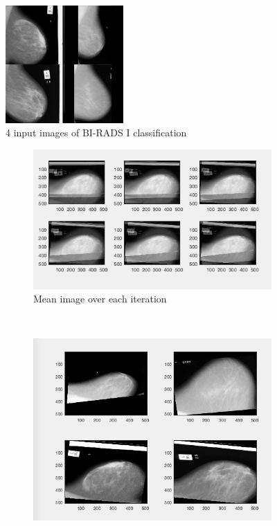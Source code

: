 \begin{figure}[!ht]
  \centering
  \includegraphics[width=0.4\textwidth]{Chapter2/non-prob-img/big_scan_1.jpg}
  \caption{4 input images of BI-RADS I classification}
  \label{fig:input}
\end{figure}

\begin{figure}[!ht]
    \centering
    \begin{subfigure}[b]{0.4\textwidth}
        \includegraphics[width=\textwidth]{Chapter2/non-prob-img/iteration-mean.png}
        \caption{Mean image over each iteration}
        \label{fig:mean-imgs}
    \end{subfigure}
    ~ %
    \begin{subfigure}[b]{0.4\textwidth}
        \includegraphics[width=\textwidth]{Chapter2/non-prob-img/adj-ser.png}

\end{subfigure}
\end{figure}
